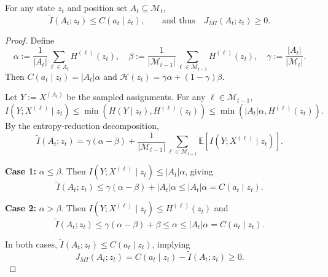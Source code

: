 \begin{observationbox}
\begin{proposition}
\label{prop:mibound}
For any state $z_t$ and position set $A_t \subseteq \mathcal{M}_t$,
\begin{equation}
\tilde{I}(A_t; z_t) \le C(a_t \mid z_t), \qquad \text{and thus} \quad J_{MI}(A_t; z_t) \ge 0.
\end{equation}
\end{proposition}
\end{observationbox}

\begin{proof}
Define
\begin{equation}
\alpha := \frac{1}{|A_t|} \sum_{\ell \in A_t} H^{(\ell)}(z_t), \quad
\beta := \frac{1}{|\mathcal{M}_{t-1}|} \sum_{\ell \in \mathcal{M}_{t-1}} H^{(\ell)}(z_t), \quad
\gamma := \frac{|A_t|}{|\mathcal{M}_t|}.
\end{equation}
Then $C(a_t \mid z_t) = |A_t| \alpha$ and $\mathcal{H}(z_t) = \gamma \alpha + (1-\gamma) \beta$.

Let $Y := X^{(A_t)}$ be the sampled assignments. For any $\ell \in \mathcal{M}_{t-1}$,
\begin{equation}
I(Y; X^{(\ell)} \mid z_t) \le \min(H(Y\mid z_t), H^{(\ell)}(z_t)) \le \min(|A_t| \alpha, H^{(\ell)}(z_t)).
\end{equation}
By the entropy-reduction decomposition,
\begin{equation}
\tilde{I}(A_t; z_t) = \gamma (\alpha - \beta) + \frac{1}{|\mathcal{M}_{t-1}|} \sum_{\ell \in \mathcal{M}_{t-1}} \mathbb{E}[I(Y; X^{(\ell)} \mid z_t)].
\end{equation}

\noindent \textbf{Case 1:} $\alpha \le \beta$. Then $I(Y; X^{(\ell)} \mid z_t) \le |A_t| \alpha$, giving
\begin{equation}
\tilde{I}(A_t; z_t) \le \gamma (\alpha - \beta) + |A_t| \alpha \le |A_t| \alpha = C(a_t \mid z_t).
\end{equation}

\noindent \textbf{Case 2:} $\alpha > \beta$. Then $I(Y; X^{(\ell)} \mid z_t) \le H^{(\ell)}(z_t)$ and
\begin{equation}
\tilde{I}(A_t; z_t) \le \gamma (\alpha - \beta) + \beta \le \alpha \le |A_t| \alpha = C(a_t \mid z_t).
\end{equation}

In both cases, $\tilde{I}(A_t; z_t) \le C(a_t \mid z_t)$, implying
\begin{equation}
J_{MI}(A_t; z_t) = C(a_t \mid z_t) - \tilde{I}(A_t; z_t) \ge 0.
\end{equation}
\end{proof}
